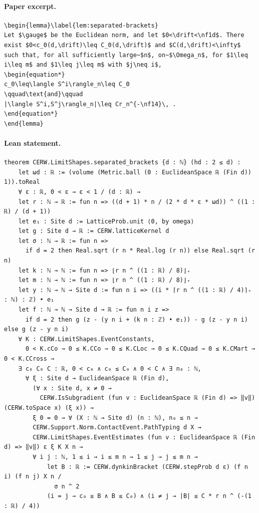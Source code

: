 \paragraph{Paper excerpt.}
\begin{verbatim}
\begin{lemma}\label{lem:separated-brackets}
Let $\gauge$ be the Euclidean norm, and let $0<\drift<\nf1d$. There exist $0<c_0(d,\drift)\leq C_0(d,\drift)$ and $C(d,\drift)<\infty$ such that, for all sufficiently large~$n$, on~$\Omega_n$, for $1\leq i\leq m$ and $1\leq j\leq m$ with $j\neq i$,
\begin{equation*}
c_0\leq\langle S^i\rangle_n\leq C_0
\qquad\text{and}\qquad
|\langle S^i,S^j\rangle_n|\leq Cr_n^{-\nf14}\, .
\end{equation*}
\end{lemma}
\end{verbatim}
\paragraph{Lean statement.}
\begin{verbatim}
theorem CERW.LimitShapes.separated_brackets {d : ℕ} (hd : 2 ≤ d) :
    let ωd : ℝ := (volume (Metric.ball (0 : EuclideanSpace ℝ (Fin d)) 1)).toReal
    ∀ ε : ℝ, 0 < ε → ε < 1 / (d : ℝ) →
    let r : ℕ → ℝ := fun n => ((d + 1) * n / (2 * d * ε * ωd)) ^ ((1 : ℝ) / (d + 1))
    let e₁ : Site d := LatticeProb.unit ⟨0, by omega⟩
    let g : Site d → ℝ := CERW.latticeKernel d
    let σ : ℕ → ℝ := fun n =>
      if d = 2 then Real.sqrt (r n * Real.log (r n)) else Real.sqrt (r n)
    let k : ℕ → ℕ := fun n => ⌊r n ^ ((1 : ℝ) / 8)⌋₊
    let m : ℕ → ℕ := fun n => ⌊r n ^ ((1 : ℝ) / 8)⌋₊
    let y : ℕ → ℕ → Site d := fun n i => ((i * ⌈r n ^ ((1 : ℝ) / 4)⌉₊ : ℕ) : ℤ) • e₁
    let f : ℕ → ℕ → Site d → ℝ := fun n i z =>
      if d = 2 then g (z - (y n i + (k n : ℤ) • e₁)) - g (z - y n i) else g (z - y n i)
    ∀ K : CERW.LimitShapes.EventConstants,
      0 < K.cCo → 0 ≤ K.CCo → 0 ≤ K.CLoc → 0 ≤ K.CQuad → 0 ≤ K.CMart → 0 < K.CCross →
    ∃ c₀ C₀ C : ℝ, 0 < c₀ ∧ c₀ ≤ C₀ ∧ 0 < C ∧ ∃ n₀ : ℕ,
      ∀ ξ : Site d → EuclideanSpace ℝ (Fin d),
        (∀ x : Site d, x ≠ 0 →
          CERW.IsSubgradient (fun v : EuclideanSpace ℝ (Fin d) => ‖v‖) (CERW.toSpace x) (ξ x)) →
        ξ 0 = 0 → ∀ (X : ℕ → Site d) (n : ℕ), n₀ ≤ n →
        CERW.Support.Norm.ContactEvent.PathTyping d X →
        CERW.LimitShapes.EventEstimates (fun v : EuclideanSpace ℝ (Fin d) => ‖v‖) ε ξ K X n →
        ∀ i j : ℕ, 1 ≤ i → i ≤ m n → 1 ≤ j → j ≤ m n →
            let B : ℝ := CERW.dynkinBracket (CERW.stepProb d ε) (f n i) (f n j) X n /
              σ n ^ 2
            (i = j → c₀ ≤ B ∧ B ≤ C₀) ∧ (i ≠ j → |B| ≤ C * r n ^ (-(1 : ℝ) / 4))
\end{verbatim}
